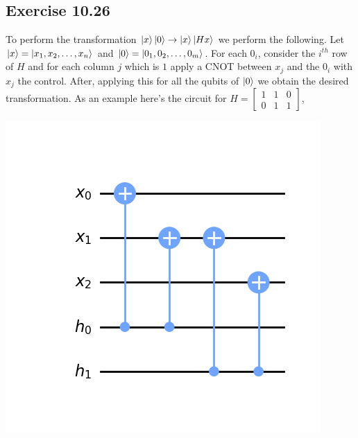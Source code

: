 \documentclass[a4paper,12pt]{article}
\begin{document}
\subsection*{Exercise 10.26}
To perform the transformation $\ket{x}\ket{0}\rightarrow\ket{x}\ket{Hx}$ we perform the
following. Let $\ket{x}=\ket{x_1,x_2,\ldots,x_n}$ and $\ket{0}=\ket{0_1,0_2,\ldots, 0_m}$.
 For each $0_i$,
consider the $i^{th}$ row of $H$ and for each column $j$ which is $1$ apply a
CNOT between $x_j$ and the $0_i$ with $x_j$ the control. After,
applying this for all the qubits of $\ket{0}$ we obtain the desired transformation. As an example
here's the circuit for $H=\begin{bmatrix}
    1 & 1 & 0\\
    0& 1&1
\end{bmatrix}$,\\
\begin{center}
    \includegraphics[scale=0.7]{26.png}
\end{center}
\end{document}
